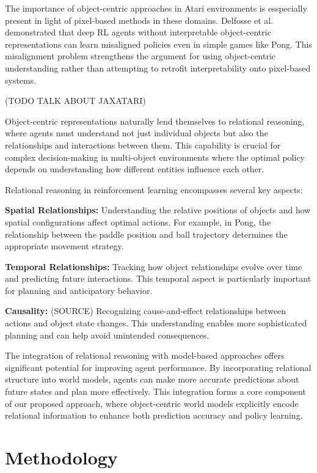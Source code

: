 \documentclass[
	english,
	ruledheaders=section,
	class=report,
	thesis={type=master},
	accentcolor=9c,
	custommargins=true,
	marginpar=false,
	parskip=half-,
	fontsize=11pt,
]{tudapub}
\begin{document}
The importance of object-centric approaches in Atari environments is
esspecially present in light of pixel-based methods in these domains. Delfosse
et al. demonstrated that deep RL agents without interpretable object-centric
representations can learn misaligned policies even in simple games like Pong.
\cite{delfosse2024interpretableconceptbottlenecksalign} This misalignment
problem strengthens the argument for using object-centric understanding rather
than attempting to retrofit interpretability onto pixel-based systems.

(TODO TALK ABOUT JAXATARI)

Object-centric representations naturally lend themselves to relational
reasoning, where agents must understand not just individual objects but also
the relationships and interactions between them. This capability is crucial for
complex decision-making in multi-object environments where the optimal policy
depends on understanding how different entities influence each other.

Relational reasoning in reinforcement learning encompasses several key aspects:

\textbf{Spatial Relationships:} Understanding the relative positions of objects and how spatial configurations affect optimal actions. For example, in Pong, the relationship between the paddle position
and ball trajectory determines the appropriate movement strategy.

\textbf{Temporal Relationships:} Tracking how object relationships evolve over time and predicting future interactions. This temporal aspect is particularly important for planning and anticipatory behavior.

\textbf{Causality:} (SOURCE) Recognizing cause-and-effect relationships between actions and object state changes. This understanding enables more sophisticated planning and can help avoid unintended consequences.

The integration of relational reasoning with model-based approaches offers
significant potential for improving agent performance. By incorporating
relational structure into world models, agents can make more accurate
predictions about future states and plan more effectively. This integration
forms a core component of our proposed approach, where object-centric world
models explicitly encode relational information to enhance both prediction
accuracy and policy learning.

\chapter{Methodology}
\label{chap:methodology}
\end{document}
